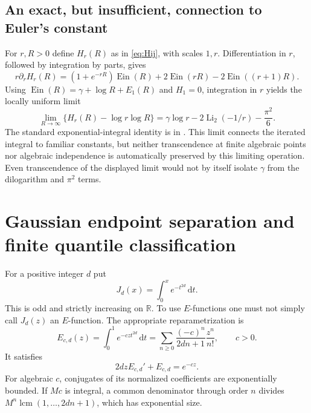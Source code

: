 \documentclass[11pt,a4paper]{article}
\numberwithin{equation}{section}
\theoremstyle{definition}
\theoremstyle{remark}
\newcommand{\R}{\mathbb R}
\newcommand{\Ein}{\operatorname{Ein}}
\newcommand{\lcm}{\operatorname{lcm}}
\newcommand{\dd}{\,\mathrm d}
\begin{document}
\subsection{An exact, but insufficient, connection to Euler's constant}
For $r,R>0$ define $H_r(R)$ as in \eqref{eq:Hij}, with scales $1,r$.
Differentiation in $r$, followed by integration by parts, gives
\begin{equation}
 r\partial_rH_r(R)=(1+e^{-rR})\Ein(R)
 +2\Ein(rR)-2\Ein((r+1)R).
\end{equation}
Using $\Ein(R)=\gamma+\log R+E_1(R)$ and $H_1=0$, integration in $r$
yields the locally uniform limit
\begin{equation}\label{eq:ein-gamma-limit}
 \lim_{R\to\infty}\{H_r(R)-\log r\log R\}
 =\gamma\log r-2\operatorname{Li}_2(-1/r)-\frac{\pi^2}{6}.
\end{equation}
The standard exponential-integral identity is in \cite{DLMF}. This limit
connects the iterated integral to familiar constants, but neither
transcendence at finite algebraic points nor algebraic independence is
automatically preserved by this limiting operation. Even transcendence of
the displayed limit would not by itself isolate $\gamma$ from the dilogarithm
and $\pi^2$ terms.

\section{Gaussian endpoint separation and finite quantile classification}\label{sec:gaussian}
For a positive integer $d$ put
\[
 J_d(x)=\int_0^x e^{-t^{2d}}\dd t.
\]
This is odd and strictly increasing on $\R$. To use $E$-functions one must
not simply call $J_d(z)$ an $E$-function. The appropriate reparametrization is
\begin{equation}
 E_{c,d}(z)=\int_0^1e^{-czt^{2d}}\dd t
 =\sum_{n\ge0}\frac{(-c)^n}{2dn+1}\frac{z^n}{n!},\qquad c>0.
\end{equation}
It satisfies
\begin{equation}\label{eq:gauss-ode}
 2dzE_{c,d}'+E_{c,d}=e^{-cz}.
\end{equation}
For algebraic $c$, conjugates of its normalized coefficients are exponentially
bounded. If $Mc$ is integral, a common denominator through order $n$ divides
$M^n\lcm(1,\ldots,2dn+1)$, which has exponential size.
\end{document}
